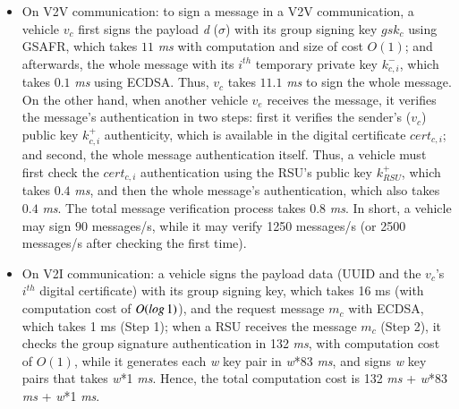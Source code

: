 \documentclass[preprint,12pt]{elsarticle}
\begin{document}
\begin{itemize}
	\begin{itemize}
		\item On V2V communication: to sign a message in a V2V communication, a vehicle $v_{c}$ first signs the payload \textit{d} ($\sigma$) with its group signing key $gsk_{c}$ using GSAFR, which takes $11$ \textit{ms} with computation and size of cost $O (1)$; and afterwards, the whole message with its $i^{th}$ temporary private key $k^{-}_{c, i}$, which takes $0.1$ \textit{ms} using ECDSA. Thus, $v_{c}$ takes $11.1$ \textit{ms} to sign the whole message. On the other hand, when another vehicle $v_{e}$ receives the message, it verifies the message's authentication in two steps: first it verifies the sender's ($v_{c}$) public key $k^{+}_{c, i}$ authenticity, which is  available in the digital certificate $cert_{c, i}$; and second, the whole message authentication itself. Thus, a vehicle must first check the $cert_{c, i}$ authentication using the RSU's public key $k^{+}_{RSU}$, which takes $0.4$ \textit{ms}, and then the whole message's authentication, which also takes $0.4$ \textit{ms}. The total message verification process takes $0.8$ \textit{ms}. In short, a vehicle may sign $90$ messages/s, while it may verify 1250 messages/s (or 2500 messages/s after checking the first time).
		
			
		\item On V2I communication: a vehicle signs the payload data (UUID and the $v_{c}$'s $i^{th}$ digital certificate) with its group signing key, which takes 16 ms (with computation cost of $O (log\thinspace 1)$), and the request message $m_c$ with ECDSA, which takes 1 ms  (Step 1); when a RSU receives the message $m_c$ (Step 2), it checks the group signature authentication in 132 \textit{ms}, with computation cost of $O (1)$, while it generates each \textit{w} key pair in \textit{w}*83 \textit{ms}, and signs \textit{w} key pairs that takes \textit{w}*1 \textit{ms}. Hence, the total computation cost is 132 \textit{ms} + \textit{w}*83 \textit{ms} +  \textit{w}*1 \textit{ms}.
		
	\end{itemize}
	

\end{itemize}
\end{document}
